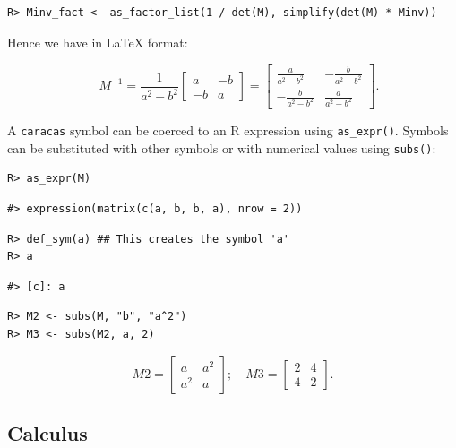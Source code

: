 \begin{verbatim}
R> Minv_fact <- as_factor_list(1 / det(M), simplify(det(M) * Minv))
\end{verbatim}

Hence we have in LaTeX format:

\[
\quad M^{-1} = \frac{1}{a^{2} - b^{2}}  \left[\begin{matrix}a & - b\\- b & a\end{matrix}\right] = \left[\begin{matrix}\frac{a}{a^{2} - b^{2}} & - \frac{b}{a^{2} - b^{2}}\\- \frac{b}{a^{2} - b^{2}} & \frac{a}{a^{2} - b^{2}}\end{matrix}\right] .
\]

A \texttt{caracas} symbol can be coerced to an R expression
using \texttt{as\_expr()}.
Symbols can be substituted with other symbols or with numerical values
using \texttt{subs()}:

\begin{verbatim}
R> as_expr(M)
\end{verbatim}

\begin{verbatim}
#> expression(matrix(c(a, b, b, a), nrow = 2))
\end{verbatim}

\begin{verbatim}
R> def_sym(a) ## This creates the symbol 'a'
R> a
\end{verbatim}

\begin{verbatim}
#> [c]: a
\end{verbatim}

\begin{verbatim}
R> M2 <- subs(M, "b", "a^2")
R> M3 <- subs(M2, a, 2)
\end{verbatim}

\[
M2 = \left[\begin{matrix}a & a^{2}\\a^{2} & a\end{matrix}\right]; \quad
M3 = \left[\begin{matrix}2 & 4\\4 & 2\end{matrix}\right].
\]

\hypertarget{calculus}{%
\subsection{Calculus}\label{calculus}}

